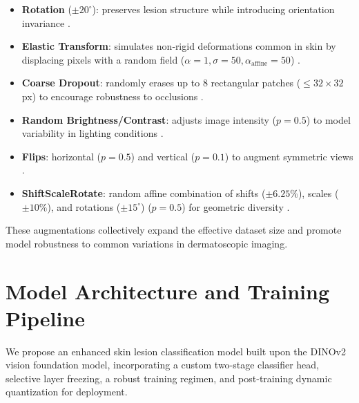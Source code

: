 \begin{itemize}
  \item \textbf{Rotation} (\(\pm20^\circ\)): preserves lesion structure while introducing orientation invariance \cite{Buslaev2020}.
  \item \textbf{Elastic Transform}: simulates non‐rigid deformations common in skin by displacing pixels with a random field (\(\alpha=1, \sigma=50, \alpha_{\text{affine}}=50\)) \cite{AlbumentationsAPI2024}.
  \item \textbf{Coarse Dropout}: randomly erases up to 8 rectangular patches (\(\le32\times32\) px) to encourage robustness to occlusions \cite{AlbumentationsDocs2024}.
  \item \textbf{Random Brightness/Contrast}: adjusts image intensity (\(p=0.5\)) to model variability in lighting conditions \cite{AlbumentationsDocs2024}.
  \item \textbf{Flips}: horizontal (\(p=0.5\)) and vertical (\(p=0.1\)) to augment symmetric views \cite{AlbumentationsAPI2024}.
  \item \textbf{ShiftScaleRotate}: random affine combination of shifts (\(\pm6.25\%\)), scales (\(\pm10\%\)), and rotations (\(\pm15^\circ\)) (\(p=0.5\)) for geometric diversity \cite{AlbumentationsAPI2024}.
\end{itemize}

These augmentations collectively expand the effective dataset size and promote model robustness to common variations in dermatoscopic imaging.

\section{Model Architecture and Training Pipeline}

We propose an enhanced skin lesion classification model built upon the DINOv2 vision foundation model, incorporating a custom two-stage classifier head, selective layer freezing, a robust training regimen, and post-training dynamic quantization for deployment.

